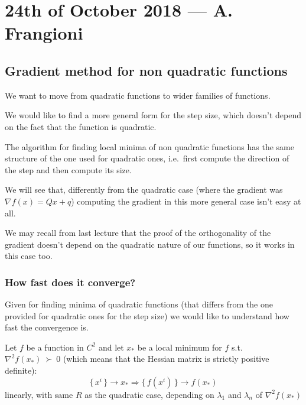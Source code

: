 \documentclass[computational_mathematics.tex]{subfiles}
\begin{document}
\section{24th of October 2018 --- A. Frangioni}

\subsection{Gradient method for non quadratic functions}
We want to move from quadratic functions to wider families of functions.


We would like to find a more general form for the step size, which doesn't depend on the fact that the function is quadratic.

The algorithm for finding local minima of non quadratic functions has the same structure of the one used for quadratic ones, i.e.~first compute the direction of the step and then compute its size.

We will see that, differently from the quadratic case (where the gradient was $\nabla f(x) = Qx + q$) computing the gradient in this more general case isn't easy at all.

We may recall from last lecture that the proof of the orthogonality of the gradient doesn't depend on the quadratic nature of our functions, so it works in this case too.

\subsubsection{How fast does it converge?}
Given  for finding minima of quadratic functions (that differs from the one provided for quadratic ones for the step size) we would like to understand how fast the convergence is.


\begin{theorem}
  Let $f$ be a function in $C^2$ and let $x_*$ be a local minimum for $f$ s.t.~$\nabla^2 f(x_*)~\succ~0$ (which means that the Hessian matrix is strictly positive definite):
       \[
       \{ \, x^i \, \} \to x_*
        \Longrightarrow \{ \, f(x^i) \, \} \to f(x_*)
      \]
        linearly, with same $R$ as the quadratic case, depending on
       $\lambda_1$ and $\lambda_n$ of $\nabla^2 f(x_*)$
\end{theorem}
\end{document}
